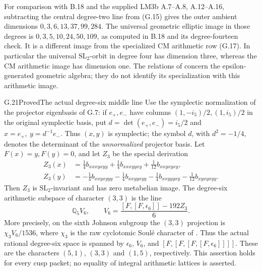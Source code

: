 For comparison with B.18 and the supplied LM3b A.7--A.8,
A.12--A.16, subtracting the central degree-two line from (G.15)
gives the outer ambient dimensions
$0,3,6,13,37,99,284$. The universal geometric elliptic image in
those degrees is $0,3,5,10,24,50,109$, as computed in B.18 and
its degree-fourteen check. It is a different image from the
specialized CM arithmetic row (G.17). In particular the universal
$\mathrm{SL}_2$-orbit in degree four has dimension three, whereas
the CM arithmetic image has dimension one. The relations of
\citet[Theorem 1]{Pollack2009} concern the epsilon-generated
geometric algebra; they do not identify its specialization with
this arithmetic image.

\begin{statement}{G.21}{Proved}{The actual degree-six middle line}
Use the symplectic normalization of the projector eigenbasis of G.7:
if $e_+,e_-$ have columns $(1,-i_5)/2,(1,i_5)/2$ in the original
symplectic basis, put $d=\det(e_+,e_-)=i_5/2$ and
$x=e_+,\ y=d^{-1}e_-$. Thus $(x,y)$ is symplectic;
the symbol $d$, with $d^2=-1/4$, denotes the determinant of the
\emph{unnormalized} projector basis.
Let $F(x)=y,F(y)=0$, and let $Z_3$ be the special derivation
\[
\begin{aligned}
 Z_3(x)&=\tfrac14 b_{xxxyxyy}+\tfrac14 b_{xxxyyxy}
                +\tfrac1{12}b_{xxyxyxy},\\
 Z_3(y)&=-\tfrac14 b_{xxyxyyy}-\tfrac14 b_{xxyyxyy}
          -\tfrac14 b_{xxyyyxy}-\tfrac1{12}b_{xyxyxyy}.
\end{aligned}                                                    \tag{G.21}
\]
Then $Z_3$ is $\mathrm{SL}_2$-invariant and has zero metabelian image.
The degree-six arithmetic subspace of character $(3,3)$ is the line
\[
 \mathbb Q_5 V_6,\qquad
 V_6=\frac{[F,[F,\epsilon_6]]-192Z_3}{6}.                \tag{G.22}
\]
More precisely, on the sixth Johnson subgroup the $(3,3)$ projection is
$\chi_3 V_6/1536$, where $\chi_3$ is the raw cyclotomic Soul\'e
character of \citet[Definition 1.5]{IshiiGoto2026}. Thus the actual
rational degree-six space is spanned by $\epsilon_6$, $V_6$, and
$[F,[F,[F,[F,\epsilon_6]]]]$. These are the characters $(5,1)$,
$(3,3)$ and $(1,5)$, respectively. This assertion holds for every
cusp packet; no equality of integral arithmetic lattices is asserted.
\end{statement}
